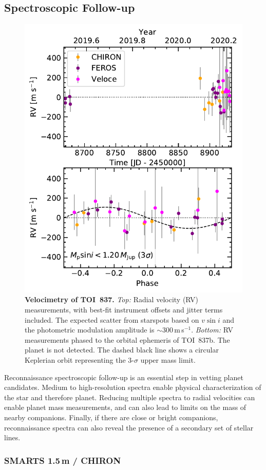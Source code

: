\documentclass[12pt,twocolumn,tighten]{aastex63}
\newcommand{\tn}{TOI~837} %
\newcommand{\pn}{TOI~837b} %
\begin{document}



\subsection{Spectroscopic Follow-up}
\label{subsec:spectra}

\begin{figure}[!t]
	\begin{center}
		\leavevmode
		\includegraphics[width=.48\textwidth]{f5.pdf}
	\end{center}
	\vspace{-0.7cm}
	\caption{
    {\bf Velocimetry of \tn.} {\it Top:} Radial velocity (RV)
    measurements, with best-fit instrument offsets and jitter terms
    included.  The expected scatter from starspots based on $v\sin i$
    and the photometric modulation amplitude is
    $\sim$300$\,$m$\,$s$^{-1}$.  {\it Bottom:} RV measurements phased to the
    orbital ephemeris of \pn.  The planet is not detected.  The dashed black
    line shows a circular Keplerian orbit representing the 3-$\sigma$
    upper mass limit.
    \label{fig:rvs}
	}
\end{figure}


Reconnaissance spectroscopic follow-up is an essential step in vetting
planet candidates.  Medium to high-resolution spectra enable physical
characterization of the star and therefore planet.  Reducing multiple
spectra to radial velocities can enable planet mass
measurements, and can also lead to limits on the mass of nearby
companions.  Finally, if there are close or bright companions,
reconnaissance spectra can also reveal the presence of a secondary set
of stellar lines.

\subsubsection{SMARTS 1.5$\,$m / CHIRON}
\label{subsec:chiron}
\end{document}
